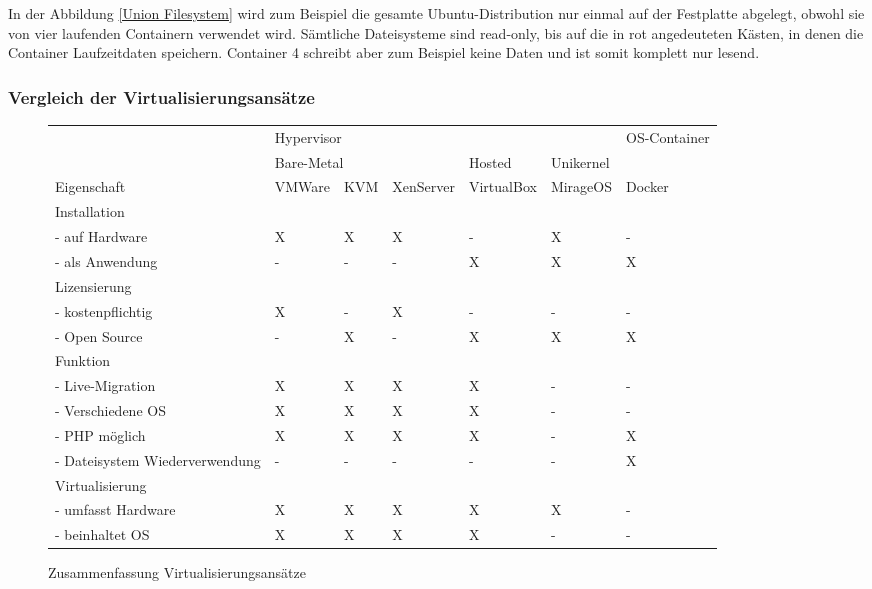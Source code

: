 In der Abbildung \ref{Union Filesystem} wird zum Beispiel die gesamte Ubuntu-Distribution nur einmal auf der Festplatte abgelegt, obwohl sie von vier laufenden Containern verwendet wird. Sämtliche Dateisysteme sind read-only, bis auf die in rot angedeuteten Kästen, in denen die Container Laufzeitdaten speichern. Container 4 schreibt aber zum Beispiel keine Daten und ist somit komplett nur lesend.

\subsubsection{Vergleich der Virtualisierungsansätze}

\begin{figure}[!ht]
  \begin{center}
    \resizebox{15cm}{!} {
      \begin{tabular}{|l|l|l|l|l|l|l|}
      \hline
      {} & \multicolumn{5}{|l|}{Hypervisor} & OS-Container \\
      \cline{2-6}
      {} & \multicolumn{3}{|l|}{Bare-Metal} & Hosted & Unikernel & {} \\
      \hline
      Eigenschaft & VMWare & KVM & XenServer & VirtualBox & MirageOS & Docker \\
      \hline
      Installation & \multicolumn{6}{|l|}{} \\
      \hline
      - auf Hardware & X & X & X & - & X & - \\
      \hline
      - als Anwendung & - & - & - & X & X & X \\
      \hline
      Lizensierung & \multicolumn{6}{|l|}{} \\
      \hline
      - kostenpflichtig & X & - & X & - & - & - \\
      \hline
      - Open Source & - & X & - & X & X & X \\
      \hline
      Funktion & \multicolumn{6}{|l|}{} \\
      \hline
      - Live-Migration & X & X & X & X & - & - \\
      \hline
      - Verschiedene OS & X & X & X & X & - & - \\
      \hline
      - PHP möglich & X & X & X & X & - & X \\
      \hline
      - Dateisystem Wiederverwendung & - & - & - & - & - & X \\
      \hline
      Virtualisierung & \multicolumn{6}{|l|}{} \\
      \hline
      - umfasst Hardware & X & X & X & X & X & - \\
      \hline
      - beinhaltet OS & X & X & X & X & - & - \\      
      \hline
      \end{tabular}
    }
    \caption{Zusammenfassung Virtualisierungsansätze}
  \end{center}
\end{figure}

